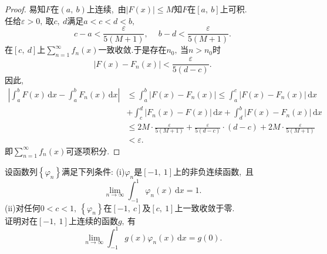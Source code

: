 	\begin{proof}
		易知$F$在$\left(a,\ b\right)$上连续,\ 由$\left|F(x)\right|\le M$知$F$在$\left[a,\ b\right]$上可积.\\
		任给$\varepsilon>0,\ $取$c,\ d$满足$a<c<d<b,\ $
		$$c-a<\frac{\varepsilon}{5(M+1)},\ \quad b-d<\frac{\varepsilon}{5(M+1)}.$$
		在$\left[c,\ d\right]$上$\sum\limits_{n=1}^{\infty}f_n(x)$一致收敛.于是存在$n_0,\ $当$n>n_0$时
		$$\left|F(x)-F_n(x)\right|<\frac{\varepsilon}{5(d-c)}.$$
		因此,\ 
		\begin{align*}
			\left|\int_{a}^{b}F(x)\,\text{d}x-\int_{a}^{b}F_n(x)\,\text{d}x\right|&\le\int_{a}^{b}\left|F(x)-F_n(x)\right|\le\int_{a}^{c}\left|F(x)-F_n(x)\right|\,\text{d}x\\
			&+\int_{c}^{d}\left|F_n(x)-F(x)\right|\,\text{d}x+\int_{d}^{b}\left|F(x)-F_n(x)\right|\,\text{d}x\\
			&\le2M\cdot\frac{\varepsilon}{5(M+1)}+\frac{\varepsilon}{5(d-c)}\cdot(d-c)+2M\cdot\frac{\varepsilon}{5(M+1)}\\
			&<\varepsilon.
		\end{align*}
		即$\sum\limits_{n=1}^{\infty}f_n(x)$可逐项积分. 
	\end{proof}
	\newpage
	\begin{problem}
		设函数列$\left\{\varphi_n\right\}$满足下列条件:
		(i)$\varphi_n$是$\left[-1,\ 1\right]$上的非负连续函数,\ 且
		$$\lim\limits_{n\rightarrow\infty}\int_{-1}^{1}\varphi_n(x)\,\text{d}x=1.$$
		(ii)对任何$0<c<1,\ \left\{\varphi_n\right\}$在$\left[-1,\ c\right]$及$\left[c,\ 1\right]$上一致收敛于零.\\
		证明对在$\left[-1,\ 1\right]$上连续的函数$g,\ $有
		$$\lim\limits_{n\rightarrow\infty}\int_{-1}^{1}g(x)\varphi_n(x)\,\text{d}x=g(0).$$
	\end{problem}
	
